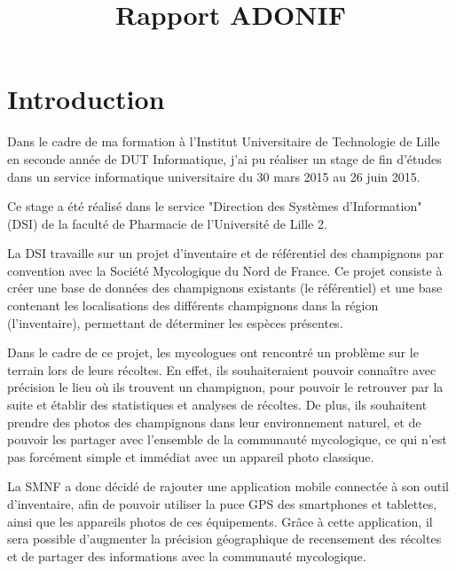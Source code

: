 \documentclass[11pt, a4paper, twoside]{report}
\title{Rapport ADONIF}
\newcommand\blankpage{%
    \null
    \thispagestyle{empty}%
    \addtocounter{page}{-1}%
    \newpage}
\begin{document}

\afterpage{\blankpage}






\tableofcontents

\chapter*{Introduction}
Dans le cadre de ma formation à l'Institut Universitaire de Technologie de Lille en seconde année de DUT Informatique, j'ai pu réaliser un stage de fin d'études dans un service informatique universitaire du 30 mars 2015 au 26 juin 2015.\newline

Ce stage a été réalisé dans le service "Direction des Systèmes d'Information" (DSI) de la faculté de Pharmacie de l'Université de Lille 2.

La DSI travaille sur un projet d'inventaire et de référentiel des champignons par convention avec la Société Mycologique du Nord de France.
Ce projet consiste à créer une base de données des champignons existants (le référentiel) et une base contenant les localisations des différents champignons dans la région (l'inventaire), permettant de déterminer les espèces présentes.\newline

Dans le cadre de ce projet, les mycologues ont rencontré un problème  sur le terrain lors de leurs récoltes. En effet, ils souhaiteraient pouvoir connaître avec précision le lieu où ils trouvent un champignon, pour pouvoir le retrouver par la suite et établir des statistiques et analyses de récoltes. De plus, ils souhaitent prendre des photos des champignons dans leur environnement naturel, et de pouvoir les partager avec l'ensemble de la communauté mycologique, ce qui n'est pas forcément simple et immédiat avec un appareil photo classique.

La SMNF a donc décidé de rajouter une application mobile connectée à son outil d'inventaire, afin de pouvoir utiliser la puce GPS des smartphones et tablettes, ainsi que les appareils photos de ces équipements. Grâce à cette application, il sera possible d'augmenter la précision géographique de recensement des récoltes et de partager des informations avec la communauté mycologique.
\newline\newline
\end{document}
